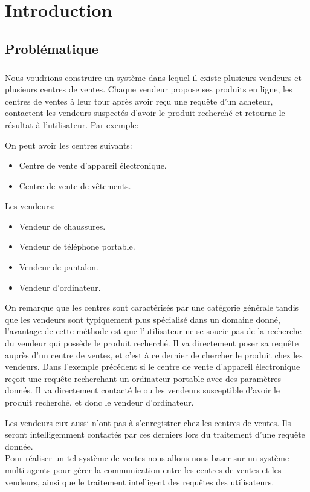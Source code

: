 \chapter{Introduction}
\section{Problématique}
\paragraph{}
Nous voudrions construire un système dans lequel il existe plusieurs vendeurs et plusieurs centres de ventes. Chaque vendeur propose ses produits en ligne, les centres de ventes à leur tour après avoir reçu une requête d’un acheteur, contactent les vendeurs suspectés d’avoir le produit recherché et retourne le résultat à l’utilisateur. Par exemple: 

On peut avoir les centres suivants:
\begin{itemize}
	\item Centre de vente d’appareil électronique.
	\item Centre de vente de vêtements.
\end{itemize}
Les vendeurs:
\begin{itemize}
	\item Vendeur de chaussures.
	\item Vendeur de téléphone portable.
	\item Vendeur de pantalon.
	\item Vendeur d’ordinateur.
\end{itemize}
On remarque que les centres sont caractérisés par une catégorie générale tandis que les vendeurs sont typiquement plus spécialisé dans un domaine donné, l’avantage de cette méthode est que l’utilisateur ne se soucie pas de la recherche du vendeur qui possède le produit recherché. Il va directement poser sa requête auprès d’un centre de ventes, et c’est à ce dernier de chercher le produit chez les vendeurs. Dans l’exemple précédent si le centre de vente d’appareil électronique reçoit une requête recherchant un ordinateur portable avec des paramètres donnés. Il va directement contacté le ou les vendeurs susceptible d’avoir le produit recherché, et donc le vendeur d’ordinateur.

Les vendeurs eux aussi n’ont pas à s’enregistrer chez les centres de ventes. Ils seront intelligemment contactés par ces derniers lors du traitement d’une requête donnée.\\
Pour réaliser un tel système de ventes nous allons nous baser sur un système multi-agents pour gérer la communication entre les centres de ventes et les vendeurs, ainsi que le traitement intelligent des requêtes des utilisateurs.
